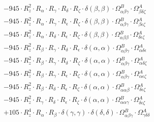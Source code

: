 \documentclass{article}
\begin{document}
\begin{subequations}
\begin{gather}
\begin{array}{c}
 \\[0.2em] 		 - 945 \cdot R_{z}^{2} \cdot R_{\alpha{}} \cdot R_{\gamma{}} \cdot R_{\delta{}} \cdot R_{\zeta{}} \cdot \delta{}\left(\beta{}, \beta{}\right) \cdot \Omega{}^{B}_{\alpha{}\beta{}\gamma{}} \cdot \Omega{}^{A}_{\beta{}\delta{}\zeta{}} 
 \\[0.2em] 		 - 945 \cdot R_{z}^{2} \cdot R_{\alpha{}} \cdot R_{\gamma{}} \cdot R_{\epsilon{}} \cdot R_{\zeta{}} \cdot \delta{}\left(\beta{}, \beta{}\right) \cdot \Omega{}^{B}_{\alpha{}\beta{}\gamma{}} \cdot \Omega{}^{A}_{\beta{}\epsilon{}\zeta{}} 
 \\[0.2em] 		 - 945 \cdot R_{z}^{2} \cdot R_{\alpha{}} \cdot R_{\delta{}} \cdot R_{\epsilon{}} \cdot R_{\zeta{}} \cdot \delta{}\left(\beta{}, \beta{}\right) \cdot \Omega{}^{B}_{\alpha{}\beta{}\beta{}} \cdot \Omega{}^{A}_{\delta{}\epsilon{}\zeta{}} 
 \\[0.2em] 		 - 945 \cdot R_{z}^{2} \cdot R_{\beta{}} \cdot R_{\gamma{}} \cdot R_{\delta{}} \cdot R_{\epsilon{}} \cdot \delta{}\left(\alpha{}, \alpha{}\right) \cdot \Omega{}^{B}_{\alpha{}\beta{}\gamma{}} \cdot \Omega{}^{A}_{\alpha{}\delta{}\epsilon{}} 
 \\[0.2em] 		 - 945 \cdot R_{z}^{2} \cdot R_{\beta{}} \cdot R_{\gamma{}} \cdot R_{\delta{}} \cdot R_{\zeta{}} \cdot \delta{}\left(\alpha{}, \alpha{}\right) \cdot \Omega{}^{B}_{\alpha{}\beta{}\gamma{}} \cdot \Omega{}^{A}_{\alpha{}\delta{}\zeta{}} 
 \\[0.2em] 		 - 945 \cdot R_{z}^{2} \cdot R_{\beta{}} \cdot R_{\gamma{}} \cdot R_{\epsilon{}} \cdot R_{\zeta{}} \cdot \delta{}\left(\alpha{}, \alpha{}\right) \cdot \Omega{}^{B}_{\alpha{}\beta{}\gamma{}} \cdot \Omega{}^{A}_{\alpha{}\epsilon{}\zeta{}} 
 \\[0.2em] 		 - 945 \cdot R_{z}^{2} \cdot R_{\beta{}} \cdot R_{\delta{}} \cdot R_{\epsilon{}} \cdot R_{\zeta{}} \cdot \delta{}\left(\alpha{}, \alpha{}\right) \cdot \Omega{}^{B}_{\alpha{}\alpha{}\beta{}} \cdot \Omega{}^{A}_{\delta{}\epsilon{}\zeta{}} 
 \\[0.2em] 		 - 945 \cdot R_{z}^{2} \cdot R_{\gamma{}} \cdot R_{\delta{}} \cdot R_{\epsilon{}} \cdot R_{\zeta{}} \cdot \delta{}\left(\alpha{}, \alpha{}\right) \cdot \Omega{}^{B}_{\alpha{}\alpha{}\gamma{}} \cdot \Omega{}^{A}_{\delta{}\epsilon{}\zeta{}} 
 \\[0.2em] 		 + 105 \cdot R_{z}^{4} \cdot R_{\alpha{}} \cdot R_{\beta{}} \cdot \delta{}\left(\gamma{}, \gamma{}\right) \cdot \delta{}\left(\delta{}, \delta{}\right) \cdot \Omega{}^{B}_{\alpha{}\beta{}\gamma{}} \cdot \Omega{}^{A}_{\gamma{}\delta{}\delta{}} 

\end{array}
\end{gather}
\end{subequations}
\end{document}
